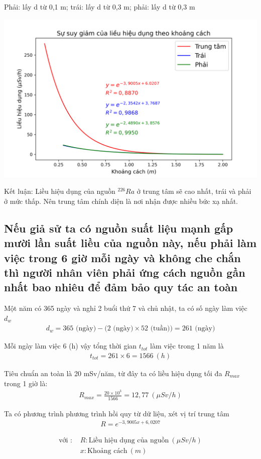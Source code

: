 \documentclass{article}
\begin{document}
Phải: lấy d từ 0,1 m; trái: lấy d từ 0,3 m; phải: lấy d từ 0,3 m
\begin{center}
	\includegraphics[scale=0.8]{ttb9}
\end{center}
Kết luận: Liều hiệu dụng của nguồn $^{226}Ra$ ở trung tâm sẽ cao nhất, trái và phải ở mức thấp. Nên trung tâm chính diện là nơi nhận được nhiều bức xạ nhất.

\subsection{Nếu giả sử ta có nguồn suất liệu mạnh gấp mười lần suất liều của nguồn này, nếu phải làm việc trong 6 giờ mỗi ngày và không che chắn thì người nhân viên phải ứng cách nguồn gần nhất bao nhiêu để đảm bảo quy tác  an toàn}

Một năm có 365 ngày và nghỉ 2 buổi thứ 7 và chủ nhật, ta có số ngày làm việc $d_w$
\begin{align*}
	d_w = 365 \text{ (ngày)} - \Big(2 \text{ (ngày)} \times 52\text{ (tuần)} \Big) = 261 \text{ (ngày)}
\end{align*}

Mỗi ngày làm việc 6 (h) vậy tổng thời gian $t_{tot}$ làm việc trong 1 năm là
\begin{align*}
	t_{tot} = 261 \times 6 = 1566 \ (h)
\end{align*}

Tiêu chuẩn an toàn là 20 mSv/năm, từ đây ta có liều hiệu dụng tối đa $R_{max}$ trong 1 giờ là:
\begin{align*}
	R_{max} = \frac{20 \times 10^3}{1566} = 12,77 \ (\mu Sv/h)
\end{align*}

Ta có phương trình phương trình hồi quy từ dữ liệu, xét vị trí trung tâm
\begin{align*}
	R = e^{-3,9005x+6,0207}
\end{align*}
\begin{fleqn}[\parindent]
\begin{equation*}
\begin{split}
\text{với : }	& R : \text{Liều hiệu dụng của nguồn} \ (\mu Sv/h)  \\
					& x : \text{Khoảng cách} \ (m)
\end{split}
\end{equation*}
\end{fleqn}
\end{document}
